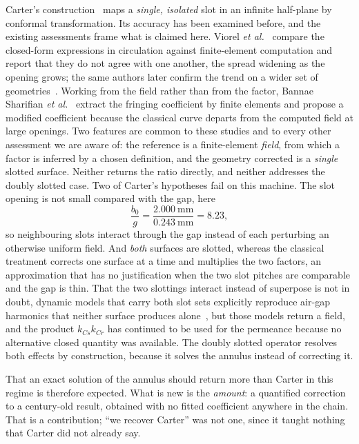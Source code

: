 \documentclass[10pt,a4paper,twocolumn]{article}
\theoremstyle{plain}
\theoremstyle{remark}
\begin{document}
Carter's construction~\cite{carter} maps a \emph{single, isolated} slot
in an infinite half-plane by conformal transformation. Its accuracy has
been examined before, and the existing assessments frame what is claimed
here. Viorel \emph{et al.}~\cite{viorel2007} compare the closed-form
expressions in circulation against finite-element computation and report
that they do not agree with one another, the spread widening as the
opening grows; the same authors later confirm the trend on a wider set
of geometries~\cite{viorel2014}. Working from the field rather than from
the factor, Bannae Sharifian \emph{et al.}~\cite{sharifian2003} extract
the fringing coefficient by finite elements and propose a modified
coefficient because the classical curve departs from the computed field
at large openings. Two features are common to these studies and to every
other assessment we are aware of: the reference is a finite-element
\emph{field}, from which a factor is inferred by a chosen definition,
and the geometry corrected is a \emph{single} slotted surface. Neither
returns the ratio directly, and neither addresses the doubly slotted
case. Two of Carter's hypotheses fail on this machine. The slot opening is not small compared
with the gap, here
\begin{equation}
\frac{b_0}{g}=\frac{\SI{2.000}{\milli\metre}}{\SI{0.243}{\milli\metre}}
=\num{8.23},
\label{eq:b0g}
\end{equation}
so neighbouring slots interact through the gap instead of each
perturbing an otherwise uniform field. And \emph{both} surfaces are
slotted, whereas the classical treatment corrects one surface at a time
and multiplies the two factors, an approximation that has no
justification when the two slot pitches are comparable and the gap is
thin. That the two slottings interact instead of superpose is not in
doubt, dynamic models that carry both slot sets explicitly reproduce
air-gap harmonics that neither surface produces alone~\cite{nandi2003}, but
those models return a field, and the product $k_{Cs}k_{Cr}$ has
continued to be used for the permeance because no alternative closed
quantity was available. The doubly slotted operator resolves both effects by construction,
because it solves the annulus instead of correcting it.

That an exact solution of the annulus should return more than Carter in
this regime is therefore expected. What is new is the \emph{amount}: a
quantified correction to a century-old result, obtained with no fitted
coefficient anywhere in the chain. That is a contribution;
``we recover Carter'' was not one, since it taught nothing that Carter
did not already say.
\end{document}
